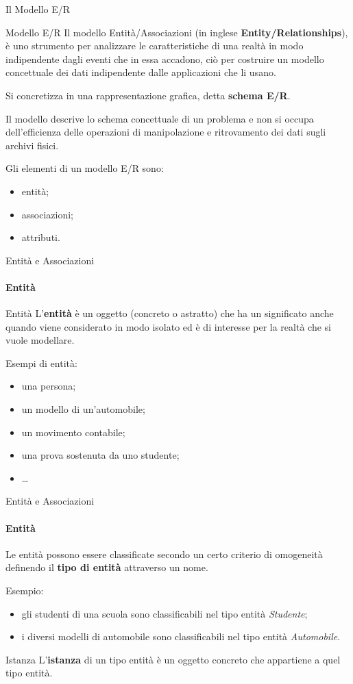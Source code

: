 \begin{frame}{Il Modello E/R}
\vspace{.5cm}
\begin{block}{Modello E/R}
Il modello Entit\`a/Associazioni (in inglese \textbf{Entity/Relationships}), \`e uno strumento per analizzare le caratteristiche di una realt\`a in modo indipendente dagli eventi che in essa accadono, ci\`o per costruire un modello concettuale dei dati indipendente dalle applicazioni che li usano.

Si concretizza in una rappresentazione grafica, detta \textbf{schema E/R}.
\end{block}
\pause
Il modello descrive lo schema concettuale di un problema e non si occupa dell'efficienza delle operazioni di manipolazione e ritrovamento dei dati sugli archivi fisici.
\pause

Gli elementi di un modello E/R sono:
\begin{itemize}
    \item entit\`a;
    \item associazioni;
    \item attributi.
\end{itemize}
\end{frame}
%
\begin{frame}{Entit\`a e Associazioni}
\framesubtitle{Entit\`a}
\begin{block}{Entit\`a}
L'\textbf{entit\`a} \`e un oggetto (concreto o astratto) che ha un significato anche quando viene considerato in modo isolato ed \`e di interesse per la realt\`a che si vuole modellare.
\end{block}
\pause
Esempi di entit\`a:
\begin{itemize}
    \item una persona;
    \item un modello di un'automobile;
    \item un movimento contabile;
    \item una prova sostenuta da uno studente;
    \item \ldots
\end{itemize}
\end{frame}
%
\begin{frame}{Entit\`a e Associazioni}
\framesubtitle{Entit\`a}
Le entit\`a possono essere classificate secondo un certo criterio di omogeneit\`a definendo il \textbf{tipo di entit\`a} attraverso un nome.
\pause
\vspace{.3cm}

Esempio:
\begin{itemize}
    \item gli studenti di una scuola sono classificabili nel tipo entit\`a \textit{Studente};
    \item i diversi modelli di automobile sono classificabili nel tipo entit\`a \textit{Automobile}.
\end{itemize}

\pause

\begin{block}{Istanza}
L'\textbf{istanza} di un tipo entit\`a \`e un oggetto concreto che appartiene a quel tipo entit\`a.
\end{block}
\end{frame}
